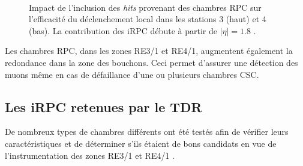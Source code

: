 \begin{itemize}[label=$\bullet$]
	\begin{figure}[ht!]
	 	\centering
	 	\\
	 	\caption{Impact de l'inclusion des \textit{hits} provenant des chambres RPC sur l'efficacité du déclenchement local dans les stations \num{3} (haut) et \num{4} (bas). La contribution des iRPC débute à partir de $|\eta|=\num{1.8}$ \cite{Lourenco:2283189}.}
	 	\label{effii}
	 \end{figure}
	
	Les chambres RPC, dans les zones RE3/1 et RE4/1, augmentent également la redondance dans la zone des bouchons. Ceci permet d'assurer une détection des muons même en cas de défaillance d'une ou plusieurs chambres CSC.
\end{itemize}

\subsection{Les iRPC retenues par le TDR}
De nombreux types de chambres différents ont été testés afin de vérifier leurs caractéristiques et de déterminer s'ils étaient de bons candidats en vue de l'instrumentation des zones RE3/1 et RE4/1 \cite{Lourenco:2283189}.

